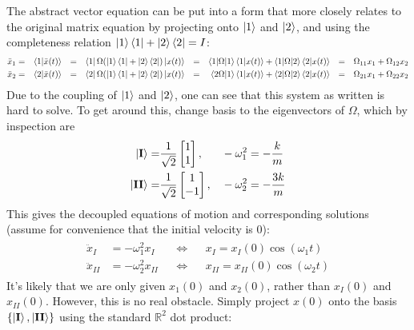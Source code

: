 \documentclass{article}
\begin{document}
The abstract vector equation can be put into a form that more closely relates to the original matrix equation by projecting onto $\ket{1}$ and $\ket{2}$, and using the completeness relation $\ket{1}\bra{1} + \ket{2}\bra{2} = I$:
\begin{align*}
\begin{aligned}
 \ddot{x}_1 & = & \braket{1 | \ddot{x}(t)} && = && \bra{1} \Omega (\ket{1}\bra{1} + \ket{2}\bra{2}) \ket{x(t)} && = && \braket{1|\Omega|1}\braket{1|x(t)} + \braket{1|\Omega|2}\braket{2|x(t)} && = &&\Omega_{11}x_1 + \Omega_{12}x_2 \\
\ddot{x}_2 & = & \braket{2 | \ddot{x}(t)} && = && \bra{2} \Omega(\ket{1}\bra{1} + \ket{2}\bra{2}) \ket{x(t)} &&= && \braket{2 \Omega | 1}\braket{1|x(t)} + \braket{2|\Omega|2}\braket{2|x(t)} && = &&
\Omega_{21}x_1 + \Omega_{22}x_2
\end{aligned}
\end{align*} 
Due to the coupling of $\ket{1}$ and $\ket{2}$, one can see that this system as written is hard to solve. To get around this, change basis to the eigenvectors of $\Omega$, which by inspection are 
\begin{align*}
\begin{aligned}
\ket{\textbf{I}} = & \frac{1}{\sqrt{2}}\begin{bmatrix} 1 \\ 1 \end{bmatrix}, && -\omega_1^2 = -\frac{k}{m} \\
\ket{\textbf{II}}  = & \frac{1}{\sqrt{2}}\begin{bmatrix}1 \\ -1\end{bmatrix}, && -\omega_2^2 = -\frac{3k}{m} 
\end{aligned}
\end{align*} 
This gives the decoupled equations of motion and corresponding solutions (assume for convenience that the initial velocity is 0): 
\begin{align*}
\begin{aligned}
\ddot{x}_I &= -\omega_1^2 x_I   &&\iff&& x_I = x_I(0)\cos(\omega_1 t) \\
\ddot{x}_{II} &= -\omega_2^2 x_{II} &&\iff&& x_{II} = x_{II}(0)\cos(\omega_2 t)
\end{aligned}
\end{align*}
It's likely that we are only given $x_1(0)$ and $x_2(0)$, rather than $x_I(0)$ and $x_{II}(0)$. However, this is no real obstacle. Simply project $x(0)$ onto the basis $\{\ket{\textbf{I}}, \ket{\textbf{II}}\}$ using the standard $\mathbb{R}^2$ dot product:
\end{document}
